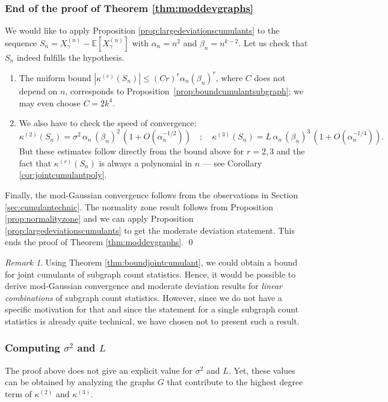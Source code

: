 \documentclass[12pt,a4paper,reqno]{amsart}
\theoremstyle{remark}
\newtheorem{remark}[lemma]{Remark}
\newcommand{\esper}{\mathbb{E}}
\newcommand{\alphan}{\alpha_n}
\newcommand{\betan}{\beta_n}
\newcommand{\SubGraph}{X^{(n)}}
\begin{document}
\subsubsection{End of the proof of Theorem \ref{thm:moddevgraphs}}
We would like to apply Proposition \ref{prop:largedeviationscumulants} to the sequence $S_n=\SubGraph_\gamma-\esper[\SubGraph_\gamma]$ with $\alphan=n^2$ and $\betan=n^{k-2}$. Let us check that $S_n$ indeed fulfills the hypothesis.\vspace{2mm}
\begin{enumerate}
\item The uniform bound $|\kappa^{(r)}(S_n)| \leq (C r)^r \alphan (\betan)^r$, where $C$ does not depend on $n$,  corresponds to Proposition~\ref{prop:boundcumulantsubgraph}; we may even choose $C=2k^4$.\vspace{2mm}
\item We also have to check the speed of convergence:
\begin{equation}\label{eq:speedconvK2K3}
    \kappa^{(2)}(S_{n})= \sigma^{2}\,\alphan\,(\betan)^2\,(1+O(\alphan^{-1/2}))
\quad;\quad
\kappa^{(3)}(S_{n}) = L \,\alphan\, (\betan)^3\,(1+O(\alphan^{-1/4})).
\end{equation}
But these estimates follow directly from the bound above for $r=2,3$ and the fact that $\kappa^{(r)}(S_{n})$ is always a polynomial in $n$ --- see Corollary \ref{cor:jointcumulantpoly}.\vspace{2mm}
\end{enumerate}
Finally, the mod-Gaussian convergence follows from the observations in Section \ref{sec:cumulantechnic}.
The normality zone result follows from Proposition \ref{prop:normalityzone} and we can apply Proposition \ref{prop:largedeviationscumulants} to get the moderate deviation statement.
 This ends the proof of Theorem \ref{thm:moddevgraphs}. \qed
\medskip

\begin{remark}
    Using Theorem \ref{thm:boundjointcumulant}, we could obtain a bound for joint cumulants of subgraph count statistics. Hence, it would be possible to derive mod-Gaussian convergence and moderate deviation results for {\em linear combinations} of subgraph count statistics. However, since we do not have a specific motivation for that and since the statement for a single subgraph count statistics is already quite technical, we have chosen not to present such a result.
\end{remark}\bigskip


\subsubsection{Computing $\sigma^2$ and $L$}
\label{subsec:sigma_L}
The proof above does not give an explicit value for $\sigma^2$ and $L$. Yet, these values can be obtained by analyzing the graphs $G$ that contribute to the highest degree term of $\kappa^{(2)}$ and $\kappa^{(3)}$.
\end{document}
